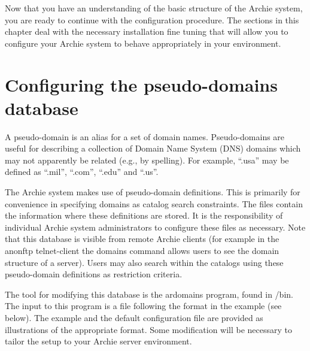 %
%
%
%



\label{chap:configure}

Now that you have an understanding of the basic structure of the Archie
system, you are ready to continue with the configuration procedure. The
sections in this chapter deal with the necessary installation fine tuning that
will allow you to configure your Archie system to behave appropriately in your
environment.

\section{Configuring the pseudo-domains database}

A pseudo-domain is an alias for a set of domain names. Pseudo-domains are
useful for describing a collection of Domain Name System (DNS) domains which
may not apparently be related (e.g., by spelling). For example, ``.usa'' may be
defined as ``.mil'', ``.com'', ``.edu'' and ``.us''.

The Archie system makes use of pseudo-domain definitions. This is primarily
for convenience in specifying domains as catalog search constraints. The files
contain the information where these
definitions are stored. It is the responsibility of individual Archie system
administrators to configure these files as necessary. Note that this database
is visible from remote Archie clients (for example in the anonftp
telnet-client the domains command allows users to see the domain structure of
a server). Users may also search within the catalogs using these pseudo-domain
definitions as restriction criteria.

The tool for modifying this database is the ardomains program, found in
\archie/bin. The input to this program is a file following the format in the
example (see below). The example and the default configuration file are
provided as illustrations of the appropriate format. Some modification will be
necessary to tailor the setup to your Archie server environment.

